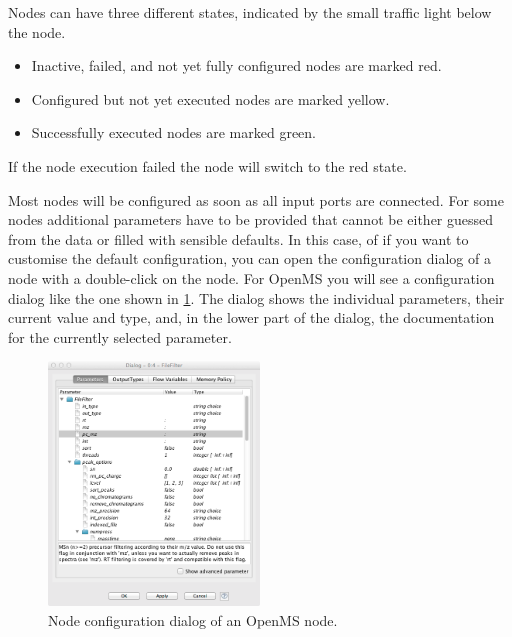 Nodes can have three different states, indicated by the small traffic light below the node.

\begin{itemize}
\item
Inactive, failed, and not yet fully configured nodes are marked red.
\item
Configured but not yet executed nodes are marked yellow.
\item
Successfully executed nodes are marked green.
\end{itemize}

If the node execution failed the node will switch to the red state.

Most nodes will be configured as soon as all input ports are connected.
For some nodes additional parameters have to be provided that cannot be either guessed from the data or filled with sensible defaults.
In this case, of if you want to customise the default configuration, you can open the configuration dialog of a node with a double-click on the node.
For OpenMS you will see a configuration dialog like the one shown in \cref{fig:knime_configure}.
The dialog shows the individual parameters, their current value and type, and, in the lower part of the dialog, the documentation for the currently selected parameter.

\begin{figure}
\centering
\includegraphics[width=0.5\textwidth]{graphics/knime_setup/knime_configure_dialog}
\caption{Node configuration dialog of an OpenMS node.}
\label{fig:knime_configure}
\end{figure}

